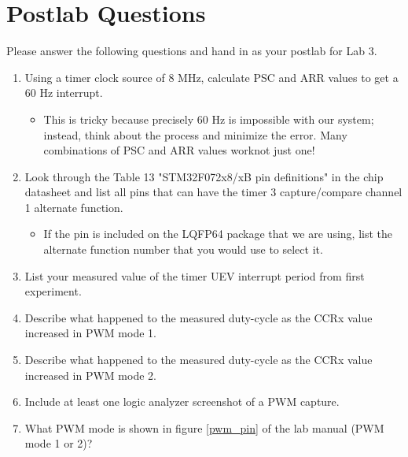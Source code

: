 \documentclass[openany,11pt,fleqn]{book} %
\begin{document}
\section{\color{blue}Postlab Questions}
\begin{question}[Postlab 3]
	Please answer the following questions and hand in as your postlab for Lab 3.
	\begin{enumerate}
		\item Using a timer clock source of 8 MHz, calculate PSC and ARR values to get a 60 Hz interrupt.
		\begin{itemize}
			\item This is tricky because precisely 60 Hz is impossible with our system; instead, think about the process and minimize the error. Many combinations of PSC and ARR values work\textemdash not just one!
		\end{itemize}
		\item Look through the Table 13 "STM32F072x8/xB pin definitions" in the chip datasheet and list all pins that can have the timer 3 capture/compare channel 1 alternate function.
		\begin{itemize}
			\item If the pin is included on the LQFP64 package that we are using, list the alternate function number that you would use to select it.
		\end{itemize}
		\item List your measured value of the timer UEV interrupt period from first experiment.
		\item Describe what happened to the measured duty-cycle as the CCRx value increased in PWM mode 1.
		\item Describe what happened to the measured duty-cycle as the CCRx value increased in PWM mode 2.
		\item Include at least one logic analyzer screenshot of a PWM capture. 
		\item What PWM mode is shown in figure \ref{pwm_pin} of the lab manual (PWM mode 1 or 2)?
	\end{enumerate}
\end{question}
\end{document}
